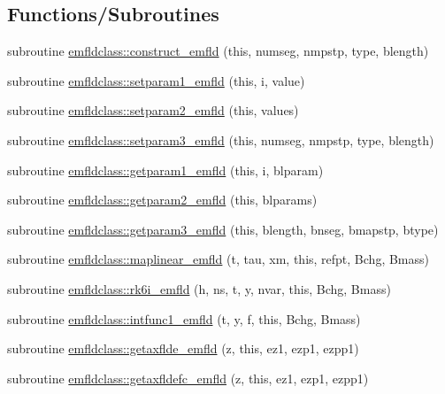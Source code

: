\subsection*{Functions/\+Subroutines}
\begin{DoxyCompactItemize}
\item 
subroutine \mbox{\hyperlink{namespaceemfldclass_a2a7e6a32e149f3dc82fbbc59d5c6ec2d}{emfldclass\+::construct\+\_\+emfld}} (this, numseg, nmpstp, type, blength)
\item 
subroutine \mbox{\hyperlink{namespaceemfldclass_a89c21ffdad41e63e575b3bc21899f600}{emfldclass\+::setparam1\+\_\+emfld}} (this, i, value)
\item 
subroutine \mbox{\hyperlink{namespaceemfldclass_ad425987a9a6e1cb7b0b2b7b1724dc961}{emfldclass\+::setparam2\+\_\+emfld}} (this, values)
\item 
subroutine \mbox{\hyperlink{namespaceemfldclass_a3f40c1b18d4a7a28ceea11a3a6b350ad}{emfldclass\+::setparam3\+\_\+emfld}} (this, numseg, nmpstp, type, blength)
\item 
subroutine \mbox{\hyperlink{namespaceemfldclass_ae0e0b406ff0837e878753ad73fc1862d}{emfldclass\+::getparam1\+\_\+emfld}} (this, i, blparam)
\item 
subroutine \mbox{\hyperlink{namespaceemfldclass_af928aa17c18a7ebd339aece97387154b}{emfldclass\+::getparam2\+\_\+emfld}} (this, blparams)
\item 
subroutine \mbox{\hyperlink{namespaceemfldclass_a07a0d1aa7a4dc67bcec915f0d5d0945e}{emfldclass\+::getparam3\+\_\+emfld}} (this, blength, bnseg, bmapstp, btype)
\item 
subroutine \mbox{\hyperlink{namespaceemfldclass_ab283b339abd3df592d8200c244652131}{emfldclass\+::maplinear\+\_\+emfld}} (t, tau, xm, this, refpt, Bchg, Bmass)
\item 
subroutine \mbox{\hyperlink{namespaceemfldclass_ae4bfa1325df7cec4a3facbe8ebc66845}{emfldclass\+::rk6i\+\_\+emfld}} (h, ns, t, y, nvar, this, Bchg, Bmass)
\item 
subroutine \mbox{\hyperlink{namespaceemfldclass_af90bd5467acb5c62a2d93f6eb1738097}{emfldclass\+::intfunc1\+\_\+emfld}} (t, y, f, this, Bchg, Bmass)
\item 
subroutine \mbox{\hyperlink{namespaceemfldclass_a2b0b3e7b6537f3a6ea857f99288186ef}{emfldclass\+::getaxflde\+\_\+emfld}} (z, this, ez1, ezp1, ezpp1)
\item 
subroutine \mbox{\hyperlink{namespaceemfldclass_ae77f42a7f667c3dd902df1d26480e602}{emfldclass\+::getaxfldefc\+\_\+emfld}} (z, this, ez1, ezp1, ezpp1)

\end{DoxyCompactItemize}

